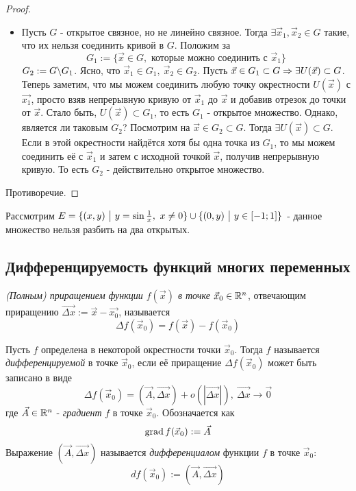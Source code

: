 \begin{proof}
\begin{itemize}
		\item Пусть $G$ - открытое связное, но не линейно связное. Тогда $\exists \vec{x}_1, \vec{x}_2 \in G$ такие, что их нельзя соединить кривой в $G$. Положим за 
		\[
			G_1 := \{\vec{x} \in G, \text{ которые можно соединить с } \vec{x}_1\}
		\]
		$G_2 := G \backslash G_1$. Ясно, что $\vec{x}_1 \in G_1,\ \vec{x}_2 \in G_2$. Пусть $\vec{x} \in G_1 \subset G \Rightarrow \exists U(\vec{x}) \subset G$. Теперь заметим, что мы можем соединить любую точку окрестности $U(\vec{x})$ с $\vec{x_1}$, просто взяв непрерывную кривую от $\vec{x}_1$ до $\vec{x}$ и добавив отрезок до точки от $\vec{x}$. Стало быть, $U(\vec{x}) \subset G_1$, то есть $G_1$ - открытое множество. Однако, является ли таковым $G_2$? Посмотрим на  $\vec{x} \in G_2 \subset G$. Тогда $\exists U(\vec{x}) \subset G$. Если в этой окрестности найдётся хотя бы одна точка из $G_1$, то мы можем соединить её с $\vec{x}_1$ и затем с исходной точкой $\vec{x}$, получив непрерывную кривую. То есть $G_2$ - действительно открытое множество.
	\end{itemize}
	Противоречие.
\end{proof}

\begin{example}
	Рассмотрим $E = \{(x, y) \ \big|\  y = \sin \frac{1}{x},\ x \neq 0\} \cup \{(0, y) \ \big|\  y \in [-1; 1]\}$ - данное множество нельзя разбить на два открытых.
\end{example}

\subsection{Дифференцируемость функций многих переменных}

\begin{definition}
	\textit{(Полным) приращением функции $f(\vec{x})$ в точке} $\vec{x}_0 \in \mathbb{R}^n$, отвечающим приращению $\overrightarrow{\Delta x} := \vec{x} - \vec{x_0}$, называется
	\[
		\Delta f(\vec{x}_0) = f(\vec{x}) - f(\vec{x}_0)
	\]
\end{definition}

\begin{definition}
	Пусть $f$ определена в некоторой окрестности точки $\vec{x}_0$. Тогда $f$ называется \textit{дифференцируемой} в точке $\vec{x}_0$, если её приращение $\Delta f(\vec{x}_0)$ может быть записано в виде
	\[
		\Delta f(\vec{x}_0) = (\vec{A}, \overrightarrow{\Delta x}) + o(|\overrightarrow{\Delta x}|),\ \overrightarrow{\Delta x} \to \vec{0}
	\]
	где $\vec{A} \in \mathbb{R}^n$ - \textit{градиент} $f$ в точке $\vec{x}_0$. Обозначается как
	\[
		\operatorname{grad} f(\vec{x}_0) := \vec{A}
	\]
	Выражение $(\vec{A}, \overrightarrow{\Delta x})$ называется \textit{дифференциалом} функции $f$ в точке $\vec{x}_0$:
	\[
		df(\vec{x}_0) := (\vec{A}, \overrightarrow{\Delta x})
	\]
\end{definition}


